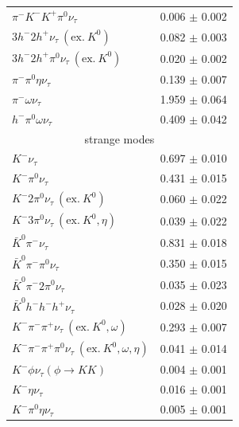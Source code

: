 \documentclass[fleqn,twoside]{article}
\begin{document}
\begin{table}[!hbtp]
\begin{tabular}{l| c}
$\pi^- K^- K^+ \pi^0 \nu_\tau$                                        & 0.006 $\pm$ 0.002 \\ 
$3h^- 2h^+ \nu_\tau ~(\mathrm{ex.~}K^0)$                              & 0.082 $\pm$ 0.003 \\ 
$3h^- 2h^+ \pi^0 \nu_\tau ~(\mathrm{ex.~}K^0)$                        & 0.020 $\pm$ 0.002 \\ 
$\pi^- \pi^0 \eta \nu_\tau$                                          & 0.139 $\pm$ 0.007 \\ 
$\pi^- \omega \nu_\tau$                                              & 1.959 $\pm$ 0.064 \\ 
$h^- \pi^0 \omega \nu_\tau$                                          & 0.409 $\pm$ 0.042 \\ 
\hline
\multicolumn{2}{c}{strange modes} \\ \hline
$K^- \nu_\tau$                                                       & 0.697 $\pm$ 0.010 \\ 
$K^- \pi^0 \nu_\tau$                                                 & 0.431 $\pm$ 0.015 \\ 
$K^- 2\pi^0 \nu_\tau ~(\mathrm{ex.~}K^0)$                            & 0.060 $\pm$ 0.022 \\ 
$K^- 3\pi^0 \nu_\tau ~(\mathrm{ex.~}K^0,\eta)$                       & 0.039 $\pm$ 0.022 \\ 
$\bar{K}^0 \pi^- \nu_\tau$                                          & 0.831 $\pm$ 0.018 \\ 
$\bar{K}^0 \pi^- \pi^0 \nu_\tau$                                    & 0.350 $\pm$ 0.015 \\ 
$\bar{K}^0 \pi^- 2\pi^0 \nu_\tau$                                   & 0.035 $\pm$ 0.023 \\ 
$\bar{K}^0 h^- h^- h^+ \nu_\tau$                                     & 0.028 $\pm$ 0.020 \\ 
$K^- \pi^- \pi^+ \nu_\tau ~(\mathrm{ex.~}K^0,\omega)$                & 0.293 $\pm$ 0.007 \\ 
$K^- \pi^- \pi^+ \pi^0 \nu_\tau ~(\mathrm{ex.~}K^0,\omega,\eta)$     & 0.041 $\pm$ 0.014 \\  
$K^- \phi \nu_\tau (\phi \to KK)$                                   & 0.004 $\pm$ 0.001 \\ 
$K^- \eta \nu_\tau$                                                 & 0.016 $\pm$ 0.001 \\ 
$K^- \pi^0 \eta \nu_\tau$                                           & 0.005 $\pm$ 0.001 \\ 

\end{tabular}
\end{table}
\end{document}
